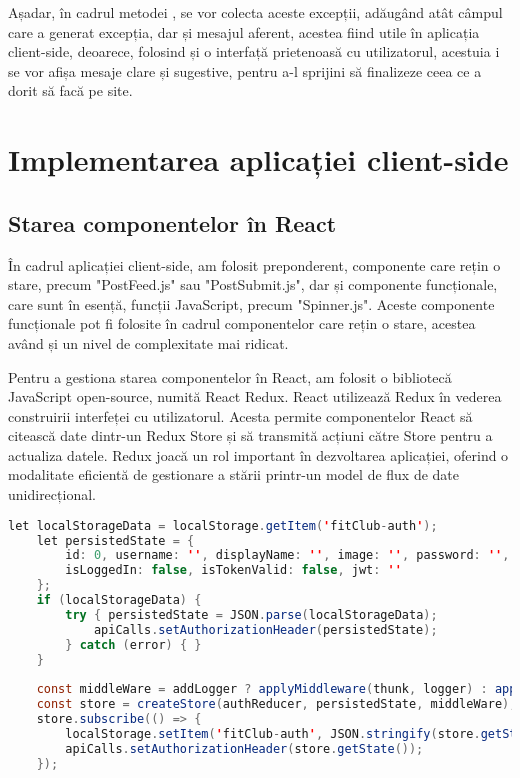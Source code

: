 Așadar, în cadrul metodei , se vor colecta aceste excepții, adăugând atât câmpul care a generat excepția, dar și mesajul aferent, acestea fiind utile în aplicația client-side, deoarece, folosind și o interfață prietenoasă cu utilizatorul, acestuia i se vor afișa mesaje clare și sugestive, pentru a-l sprijini să finalizeze ceea ce a dorit să facă pe site.\newline

\section{Implementarea aplicației client-side}

\subsection{Starea componentelor în React}

În cadrul aplicației client-side, am folosit preponderent, componente care rețin o stare, precum "PostFeed.js" sau "PostSubmit.js", dar și componente funcționale, care sunt în esență, funcții JavaScript, precum "Spinner.js". Aceste componente funcționale pot fi folosite în cadrul componentelor care rețin o stare, acestea având și un nivel de complexitate mai ridicat.\newline

Pentru a gestiona starea componentelor în React, am folosit o bibliotecă JavaScript open-source, numită React Redux\cite{.reactreduxbook}. React utilizează Redux în vederea construirii interfeței cu utilizatorul. Acesta permite componentelor React să citească date dintr-un Redux Store și să transmită acțiuni către Store pentru a actualiza datele. Redux joacă un rol important în dezvoltarea aplicației, oferind o modalitate eficientă de gestionare a stării printr-un model de flux de date unidirecțional.\newline

\begin{lstlisting}[language=Java]
	let localStorageData = localStorage.getItem('fitClub-auth');
	let persistedState = {
		id: 0, username: '', displayName: '', image: '', password: '',
		isLoggedIn: false, isTokenValid: false, jwt: '' 
	};
	if (localStorageData) {
		try { persistedState = JSON.parse(localStorageData);
			apiCalls.setAuthorizationHeader(persistedState);
		} catch (error) { }
	}
	
	const middleWare = addLogger ? applyMiddleware(thunk, logger) : applyMiddleware(thunk)
	const store = createStore(authReducer, persistedState, middleWare);
	store.subscribe(() => { 
		localStorage.setItem('fitClub-auth', JSON.stringify(store.getState()));
		apiCalls.setAuthorizationHeader(store.getState());
	});
\end{lstlisting}
\bigskip

